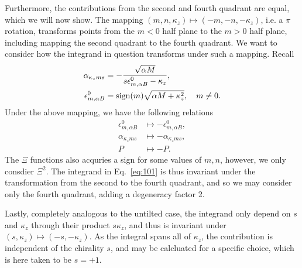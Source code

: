 Furthermore, the contributions from the second and fourth quadrant are equal, which we will now show.
The mapping \( (m,n, \kappa_z) \mapsto (-m, -n, -\kappa_z) \), i.e. a \( \pi \) rotation, transforms points from the \( m < 0 \) half plane to the \( m > 0 \) half plane, including mapping the second quadrant to the fourth quadrant.
We want to consider how the integrand in question transforms under such a mapping.
Recall
\begin{align*}
  \alpha_{\kappa_z m s} &= - \frac{\sqrt{\alpha M} }{s \epsilon_{m, \alpha B}^0 - \kappa_z},\\
  \epsilon_{m, \alpha B}^0 &= \operatorname{sign}(m) \sqrt{\alpha M + \kappa_z^2}, \quad m \neq 0.
\end{align*}
Under the above mapping, we have the following relations
\begin{align}
  \label{eq:92}
  \epsilon_{m, \alpha B}^0 &\mapsto -\epsilon_{m, \alpha B}^0,\\
  \alpha_{\kappa_z m s} &\mapsto -\alpha_{\kappa_z m s},\\
  P &\mapsto -P.
\end{align}
The \( \Xi \) functions also acquries a sign for some values of \( m,n \), however, we only consdier \( \Xi^2 \).
The integrand in Eq.~\eqref{eq:101} is thus invariant under the transformation from the second to the fourth quadrant, and so we may consider only the fourth quadrant, adding a degeneracy factor 2.

Lastly, completely analogous to the untilted case, the integrand only depend on \( s \) and \( \kappa_z \) through their product \( s \kappa_z \), and thus is invariant under \( (s, \kappa_z) \mapsto (-s, -\kappa_z) \).
As the integral spans all of \( \kappa_z \), the contribution is independent of the chirality \( s \), and may be calcluated for a specific choice, which is here taken to be \( s=+1 \).



